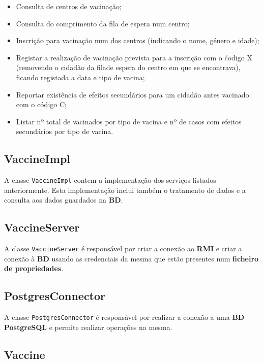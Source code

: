 \documentclass[11pt]{article}
\begin{document}
\begin{itemize}
    \item Consulta de centros de vacinação;
    \item Consulta do comprimento da fila de espera num centro;
    \item Inscrição para vacinação num dos centros (indicando o nome, género e idade);
    \item Registar a realização de vacinação prevista para a inscrição com o ćodigo X (removendo o cidadão da filade espera do centro em que se encontrava), 
    ficando registada a data e tipo de vacina;
    \item Reportar existência de efeitos secundários para um cidadão antes vacinado com o código C;
    \item Listar nº total de vacinados por tipo de vacina e nº de casos com efeitos secundários por tipo de vacina. 
\end{itemize}

\subsection{VaccineImpl}
A classe \verb|VaccineImpl| contem a implementação dos serviços listados anteriormente. Esta implementação inclui
também o tratamento de dados e a consulta aos dados guardados na \textbf{BD}.

\subsection{VaccineServer} 

\hspace{0,5cm} A classe \verb|VaccineServer| é responsável por criar a conexão ao \textbf{RMI} e criar
a conexão à \textbf{BD} usando as credenciais da mesma que estão presentes num \textbf{ficheiro de propriedades}.


\subsection{PostgresConnector}

\hspace{0,5cm} A classe \verb|PostgresConnector| é responsável por realizar a conexão a uma \textbf{BD PostgreSQL} e
permite realizar operações na mesma.

\subsection{Vaccine}
\end{document}
